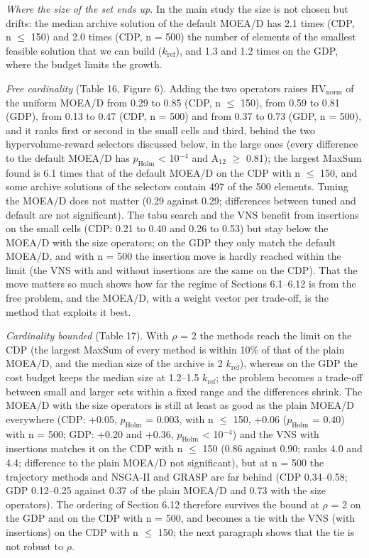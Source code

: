 \emph{Where the size of the set ends up.} In the main study the size is not chosen but drifts: the median archive solution of the default MOEA/D has 2.1 times (CDP, n $\leq$ 150) and 2.0 times (CDP, n = 500) the number of elements of the smallest feasible solution that we can build ($k_{\mathrm{ref}}$), and 1.3 and 1.2 times on the GDP, where the budget limits the growth.

\emph{Free cardinality} (Table 16, Figure 6). Adding the two operators raises $\mathrm{HV}_{\mathrm{norm}}$ of the uniform MOEA/D from 0.29 to 0.85 (CDP, n $\leq$ 150), from 0.59 to 0.81 (GDP), from 0.13 to 0.47 (CDP, n = 500) and from 0.37 to 0.73 (GDP, n = 500), and it ranks first or second in the small cells and third, behind the two hypervolume-reward selectors discussed below, in the large ones (every difference to the default MOEA/D has $p_{\mathrm{Holm}}$ < 10$^{-4}$ and A$_{12}$ $\geq$ 0.81); the largest MaxSum found is 6.1 times that of the default MOEA/D on the CDP with n $\leq$ 150, and some archive solutions of the selectors contain 497 of the 500 elements. Tuning the MOEA/D does not matter (0.29 against 0.29; differences between tuned and default are not significant). The tabu search and the VNS benefit from insertions on the small cells (CDP: 0.21 to 0.40 and 0.26 to 0.53) but stay below the MOEA/D with the size operators; on the GDP they only match the default MOEA/D, and with n = 500 the insertion move is hardly reached within the limit (the VNS with and without insertions are the same on the CDP). That the move matters so much shows how far the regime of Sections 6.1--6.12 is from the free problem, and the MOEA/D, with a weight vector per trade-off, is the method that exploits it best.

\emph{Cardinality bounded} (Table 17). With $\rho$ = 2 the methods reach the limit on the CDP (the largest MaxSum of every method is within 10\% of that of the plain MOEA/D, and the median size of the archive is 2 $k_{\mathrm{ref}}$), whereas on the GDP the cost budget keeps the median size at 1.2--1.5 $k_{\mathrm{ref}}$; the problem becomes a trade-off between small and larger sets within a fixed range and the differences shrink. The MOEA/D with the size operators is still at least as good as the plain MOEA/D everywhere (CDP: +0.05, $p_{\mathrm{Holm}}$ = 0.003, with n $\leq$ 150, +0.06 ($p_{\mathrm{Holm}}$ = 0.40) with n = 500; GDP: +0.20 and +0.36, $p_{\mathrm{Holm}}$ < 10$^{-4}$) and the VNS with insertions matches it on the CDP with n $\leq$ 150 (0.86 against 0.90; ranks 4.0 and 4.4; difference to the plain MOEA/D not significant), but at n = 500 the trajectory methods and NSGA-II and GRASP are far behind (CDP 0.34--0.58; GDP 0.12--0.25 against 0.37 of the plain MOEA/D and 0.73 with the size operators). The ordering of Section 6.12 therefore survives the bound at $\rho$ = 2 on the GDP and on the CDP with n = 500, and becomes a tie with the VNS (with insertions) on the CDP with n $\leq$ 150; the next paragraph shows that the tie is not robust to $\rho$.

